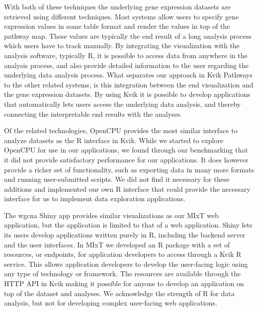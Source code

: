 With both of these techniques the underlying gene expression datasets are
retrieved using different techniques. Most systems allow users to specify gene
expression values in some table format and render the values in top of the
pathway map.  These values are typically the end result of a long analysis
process which users have to track manually. By integrating the visualization
with the analysis software, typically R, it is possible to access data from
anywhere in the analysis process, and also provide detailed information to the
user regarding the underlying data analysis process.  What separates our
approach in Kvik Pathways to the other related systems, is this integration
between the end visualization and the gene expression datasets. By using Kvik it
is possible to develop applications that automatically lets users access the
underlying data analysis, and thereby connecting the interpretable end results
with the analyses. 

Of the related technologies, OpenCPU provides the most similar interface to
analyze datasets as the R interface in Kvik. While we started to explore OpenCPU
for use in our applications, we found through our benchmarking that it did not
provide satisfactory performance for our applications. It does however provide a
richer set of functionality, such as exporting data in many more formats and
running user-submitted scripts. We did not find it necessary for these additions
and implemented our own R interface that could provide the necessary interface
for us to implement data exploration applications. 

The \gls{wgcna} Shiny app provides similar visualizations as our MIxT web
application, but the application is limited to that of a web application. Shiny
lets its users develop applications written purely in R, including the backend
server and the user interfaces. In MIxT we developed an R package with a set of
resources, or endpoints, for application developers to access through a Kvik R
service. This allows application developers to develop the user-facing logic
using any type of technology or framework. The resources are available through
the HTTP API in Kvik making it possible for anyone to develop an
application on top of the dataset and analyses. We acknowledge the strength of R
for data analysis, but not for developing complex user-facing web applications. 

